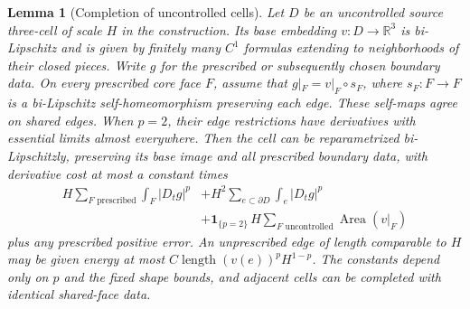\documentclass[11pt]{article}
\numberwithin{equation}{section}
\newtheorem{lemma}[theorem]{Lemma}
\theoremstyle{definition}
\theoremstyle{remark}
\newcommand{\R}{\mathbb R}
\begin{document}
\begin{lemma}[Completion of uncontrolled cells]\label{la:cell-completion}
Let $D$ be an uncontrolled source three-cell of scale $H$ in the
construction.  Its base embedding $v:D\to\R^3$ is bi-Lipschitz and is
given by finitely many $C^1$ formulas extending to neighborhoods of
their closed pieces.  Write $g$ for the prescribed or subsequently
chosen boundary data.  On every prescribed core face $F$,
assume that $g|_F=v|_F\circ s_F$, where $s_F:F\to F$ is a
bi-Lipschitz self-homeomorphism preserving each edge.  These self-maps
agree on shared edges.  When $p=2$, their edge restrictions have
derivatives with essential limits almost everywhere.
Then the cell can be reparametrized bi-Lipschitzly, preserving its
base image and all prescribed boundary data, with derivative cost
at most a constant times
\begin{equation}\label{la:cell-cost}
 \begin{split}
 H\sum_{F\text{ prescribed}}\int_F|D_tg|^p
 &+H^2\sum_{e\subset\partial D}\int_e|D_tg|^p\\
 &+\mathbf1_{\{p=2\}}\,
       H\sum_{F\text{ uncontrolled}}\operatorname{Area}(v|_F)
 \end{split}
\end{equation}
plus any prescribed positive error.  An unprescribed edge of length
comparable to $H$ may be given energy at most
$C\operatorname{length}(v(e))^pH^{1-p}$.
The constants depend only on $p$ and the fixed shape bounds, and
adjacent cells can be completed with identical shared-face data.
\end{lemma}
\end{document}
